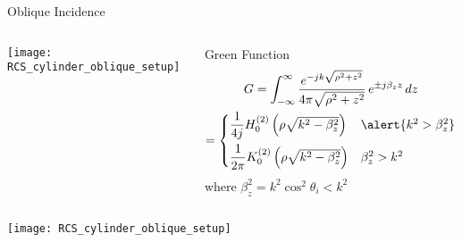 %
%

  \begin{frame}[allowframebreaks]{Oblique Incidence}

  \begin{columns}
     \centering
    \texttt{[image: RCS\_cylinder\_oblique\_setup]}
    
     \centering
   \begin{block}{Green Function}
       \begin{multline*}
         G = \int_{-\infty}^{\infty} 
        \dfrac{e^{-j k \sqrt{\rho^2+z^2}}}{4\pi \sqrt{\rho^2+z^2}}
        \, e^{\pm j\beta_z z } \, dz \\
        = 
        \begin{cases}
          \dfrac{1}{4j} H_0^{(2)}\left( \rho\sqrt{k^2-\beta_z^2}\right) 
                  & \alert{k^2 > \beta_z^2} \\[2ex]
          \dfrac{1}{2\pi} K_0^{(2)}\left( \rho\sqrt{k^2-\beta_z^2}\right) 
                  & \beta_z^2 > k^2
        \end{cases}
      \end{multline*}
      where $\beta_z^2=k^2\cos^2\theta_i < k^2$


    \end{block}

  \end{columns}


    \framebreak %

  \begin{columns}
     \centering
    \texttt{[image: RCS\_cylinder\_oblique\_setup]}
    

\end{columns}
\end{frame}
